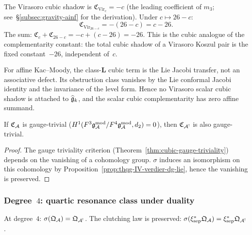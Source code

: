 \begin{computation}
The Virasoro cubic shadow is $\mathfrak{C}_{\mathrm{Vir}_c} = -c$
(the leading coefficient of $m_3$;
see~\S\ref{subsec:gravity-ainf} for the derivation).
Under $c \mapsto 26 - c$:
\[
\mathfrak{C}_{\mathrm{Vir}_{26-c}} = -(26 - c) = c - 26.
\]
The sum: $\mathfrak{C}_c + \mathfrak{C}_{26-c} = -c + (c - 26) = -26$.
This is the cubic analogue of the complementarity constant: the total
cubic shadow of a Virasoro Koszul pair is the fixed constant~$-26$,
independent of~$c$.

For affine Kac--Moody, the class-$\mathbf L$ cubic term is the Lie
Jacobi transfer, not an associative defect.  Its obstruction class
vanishes by the Lie conformal Jacobi identity and the invariance of the
level form.  Hence no Virasoro scalar cubic shadow is attached to
$\widehat{\mathfrak{g}}_k$, and the scalar cubic complementarity has zero affine
summand.
\end{computation}

\begin{corollary}
If $\mathfrak{C}_{\mathcal{A}}$ is gauge-trivial
\textup{(}$H^1(F^3\mathfrak{g}_{\mathcal{A}}^{\mathrm{mod}}/F^4\mathfrak{g}_{\mathcal{A}}^{\mathrm{mod}}, d_2) = 0$\textup{)},
then $\mathfrak{C}_{\mathcal{A}^!}$ is also gauge-trivial.
\end{corollary}

\begin{proof}
The gauge triviality criterion
(Theorem~\ref{thm:cubic-gauge-triviality})
depends on the vanishing of a cohomology group.
$\sigma$ induces an isomorphism on this cohomology by
Proposition~\ref{prop:thqg-IV-verdier-dg-lie}, hence the vanishing
is preserved.
\end{proof}

\subsubsection{Degree~$4$: quartic resonance class under duality}

\begin{proposition}
At degree~$4$:
$\sigma(\mathfrak{Q}_{\mathcal{A}}) = \mathfrak{Q}_{\mathcal{A}^!}$.
The clutching law is preserved:
$\sigma(\xi^*_{\mathrm{sep}}\mathfrak{Q}_{\mathcal{A}})
= \xi^*_{\mathrm{sep}}\mathfrak{Q}_{\mathcal{A}^!}$.
\end{proposition}

